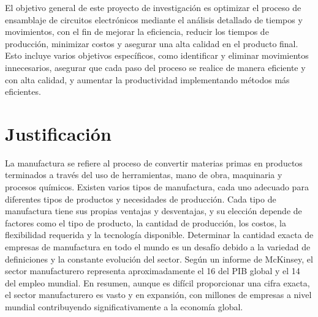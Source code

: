 El objetivo general de este proyecto de investigación es optimizar el proceso de ensamblaje de circuitos electrónicos mediante el análisis detallado de tiempos y movimientos, con el fin de mejorar la eficiencia, reducir los tiempos de producción, minimizar costos y asegurar una alta calidad en el producto final. Esto incluye varios objetivos específicos, como identificar y eliminar movimientos innecesarios, asegurar que cada paso del proceso se realice de manera eficiente y con alta calidad, y aumentar la productividad implementando métodos más eficientes.
%
%
    \section{Justificación}

% 
La manufactura se refiere al proceso de convertir materias primas en productos terminados a través del uso de herramientas, mano de obra, maquinaria y procesos químicos. Existen varios tipos de manufactura, cada uno adecuado para diferentes tipos de productos y necesidades de producción. Cada tipo de manufactura tiene sus propias ventajas y desventajas, y su elección depende de factores como el tipo de producto, la cantidad de producción, los costos, la flexibilidad requerida y la tecnología disponible. \cite{Manufactura}
Determinar la cantidad exacta de empresas de manufactura en todo el mundo es un desafío debido a la variedad de definiciones y la constante evolución del sector.
Según un informe de McKinsey, el sector manufacturero representa aproximadamente el 16 del PIB global y el 14 del empleo mundial. En resumen, aunque es difícil proporcionar una cifra exacta, el sector manufacturero es vasto y en expansión, con millones de empresas a nivel mundial contribuyendo significativamente a la economía global. \cite{Empresas}
